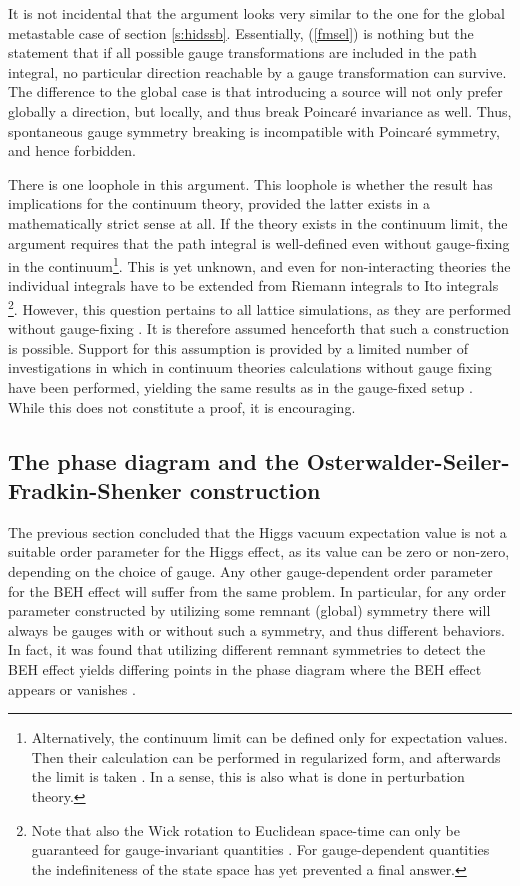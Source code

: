 \documentclass[final,12pt]{article}
\newcommand*{\pref}[1]{(\ref{#1})}
\newcommand*{\1}{1\!\!\!\bot}
\begin{document}
It is not incidental that the argument looks very similar to the one for the global metastable case of section \ref{s:hidssb}. Essentially, \pref{fmsel} is nothing but the statement that if all possible gauge transformations are included in the path integral, no particular direction reachable by a gauge transformation can survive. The difference to the global case is that introducing a source will not only prefer globally a direction, but locally, and thus break Poincar\'e invariance as well. Thus, spontaneous gauge symmetry breaking is incompatible with Poincar\'e symmetry, and hence forbidden.

There is one loophole in this argument. This loophole is whether the result has implications for the continuum theory, provided the latter exists in a mathematically strict sense at all. If the theory exists in the continuum limit, the argument requires that the path integral is well-defined even without gauge-fixing in the continuum\footnote{Alternatively, the continuum limit can be defined only for expectation values. Then their calculation can be performed in regularized form, and afterwards the limit is taken \cite{Seiler:1982pw}. In a sense, this is also what is done in perturbation theory.}. This is yet unknown, and even for non-interacting theories the individual integrals have to be extended from Riemann integrals to Ito integrals \cite{Rivers:1987hi}\footnote{Note that also the Wick rotation to Euclidean space-time can only be guaranteed for gauge-invariant quantities \cite{Seiler:1982pw}. For gauge-dependent quantities the indefiniteness of the state space has yet prevented a final answer.}. However, this question pertains to all lattice simulations, as they are performed without gauge-fixing \cite{Montvay:1994cy,Gattringer:2010zz,DeGrand:2006zz}. It is therefore assumed henceforth that such a construction is possible. Support for this assumption is provided by a limited number of investigations in which in continuum theories calculations without gauge fixing have been performed, yielding the same results as in the gauge-fixed setup \cite{Strocchi:1974xh,Arnone:2005fb,Arnone:2006ie,Rosten:2010vm}. While this does not constitute a proof, it is encouraging.

\subsection{The phase diagram and the Osterwalder-Seiler-Fradkin-Shenker construction}\label{ss:pd}

The previous section concluded that the Higgs vacuum expectation value is not a suitable order parameter for the Higgs effect, as its value can be zero or non-zero, depending on the choice of gauge. Any other gauge-dependent order parameter for the BEH effect will suffer from the same problem. In particular, for any order parameter constructed by utilizing some remnant (global) symmetry there will always be gauges with or without such a symmetry, and thus different behaviors. In fact, it was found that utilizing different remnant symmetries to detect the BEH effect yields differing points in the phase diagram where the BEH effect appears or vanishes \cite{Caudy:2007sf,Greensite:2008ss}.
\end{document}
